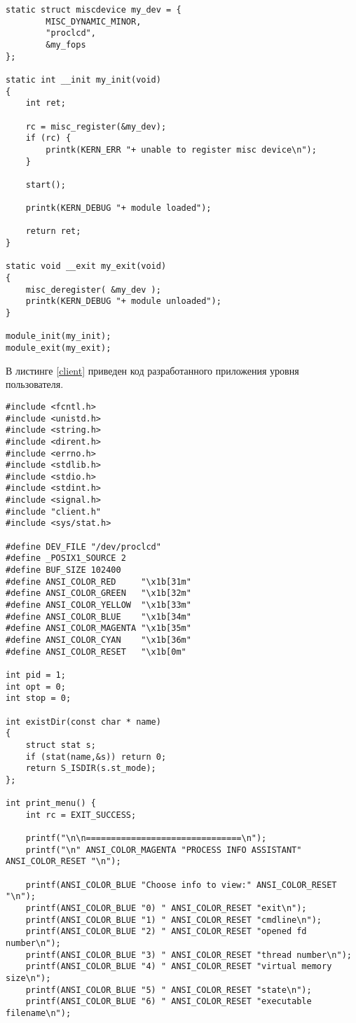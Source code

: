 \begin{appendices}
\begin{lstlisting}[label=driver,caption=Код модуля ядра~---~драйвера символьного дисплея]
static struct miscdevice my_dev = {
        MISC_DYNAMIC_MINOR,
        "proclcd",
        &my_fops
};

static int __init my_init(void)
{
    int ret;

    rc = misc_register(&my_dev);
    if (rc) {
        printk(KERN_ERR "+ unable to register misc device\n");
    }

    start();

    printk(KERN_DEBUG "+ module loaded");

    return ret;
}

static void __exit my_exit(void)
{
    misc_deregister( &my_dev );
    printk(KERN_DEBUG "+ module unloaded");
}

module_init(my_init);
module_exit(my_exit);

	\end{lstlisting}
	
	В листинге \ref{client} приведен код разработанного приложения уровня пользователя.
	
	\begin{lstlisting}[label=client,caption=Код разработанного приложения уровня пользователя]
#include <fcntl.h>
#include <unistd.h>
#include <string.h>
#include <dirent.h>
#include <errno.h>
#include <stdlib.h>
#include <stdio.h>
#include <stdint.h>
#include <signal.h>
#include "client.h"
#include <sys/stat.h>

#define DEV_FILE "/dev/proclcd"
#define _POSIX1_SOURCE 2
#define BUF_SIZE 102400
#define ANSI_COLOR_RED     "\x1b[31m"
#define ANSI_COLOR_GREEN   "\x1b[32m"
#define ANSI_COLOR_YELLOW  "\x1b[33m"
#define ANSI_COLOR_BLUE    "\x1b[34m"
#define ANSI_COLOR_MAGENTA "\x1b[35m"
#define ANSI_COLOR_CYAN    "\x1b[36m"
#define ANSI_COLOR_RESET   "\x1b[0m"

int pid = 1;
int opt = 0;
int stop = 0;

int existDir(const char * name)
{
    struct stat s;
    if (stat(name,&s)) return 0;
    return S_ISDIR(s.st_mode);
};

int print_menu() {
    int rc = EXIT_SUCCESS;

    printf("\n\n===============================\n");
    printf("\n" ANSI_COLOR_MAGENTA "PROCESS INFO ASSISTANT" ANSI_COLOR_RESET "\n");

    printf(ANSI_COLOR_BLUE "Choose info to view:" ANSI_COLOR_RESET "\n");
    printf(ANSI_COLOR_BLUE "0) " ANSI_COLOR_RESET "exit\n");
    printf(ANSI_COLOR_BLUE "1) " ANSI_COLOR_RESET "cmdline\n");
    printf(ANSI_COLOR_BLUE "2) " ANSI_COLOR_RESET "opened fd number\n");
    printf(ANSI_COLOR_BLUE "3) " ANSI_COLOR_RESET "thread number\n");
    printf(ANSI_COLOR_BLUE "4) " ANSI_COLOR_RESET "virtual memory size\n");
    printf(ANSI_COLOR_BLUE "5) " ANSI_COLOR_RESET "state\n");
    printf(ANSI_COLOR_BLUE "6) " ANSI_COLOR_RESET "executable filename\n");


\end{lstlisting}
\end{appendices}
